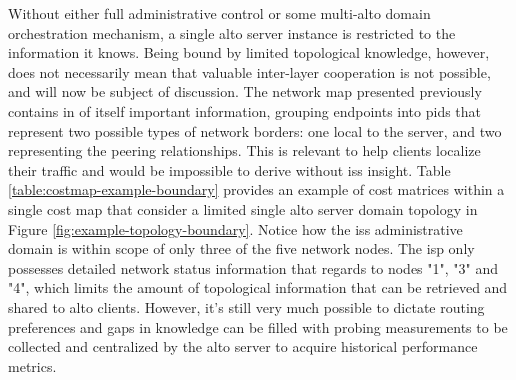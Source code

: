     Without either full administrative control or some multi-\gls{alto} domain orchestration mechanism, a single \gls{alto} server instance is restricted to the information it knows.
    Being bound by limited topological knowledge, however, does not necessarily mean that valuable inter-layer cooperation is not possible, and will now be subject of discussion.
    The network map presented previously contains in of itself important information, grouping endpoints into \glspl{pid} that represent two possible types of network borders: one local to the server, and two representing the peering relationships.
    This is relevant to help clients localize their traffic and would be impossible to derive without \glspl{is} insight.
    Table \ref{table:costmap-example-boundary} provides an example of cost matrices within a single cost map that consider a limited single \gls{alto} server domain topology in Figure \ref{fig:example-topology-boundary}.
    Notice how the \glspl{is} administrative domain is within scope of only three of the five network nodes.
    The \gls{isp} only possesses detailed network status information that regards to nodes "1", "3" and "4", which limits the amount of topological information that can be retrieved and shared to \gls{alto} clients.
    However, it's still very much possible to dictate routing preferences and gaps in knowledge can be filled with probing measurements to be collected and centralized by the \gls{alto} server to acquire historical performance metrics.

